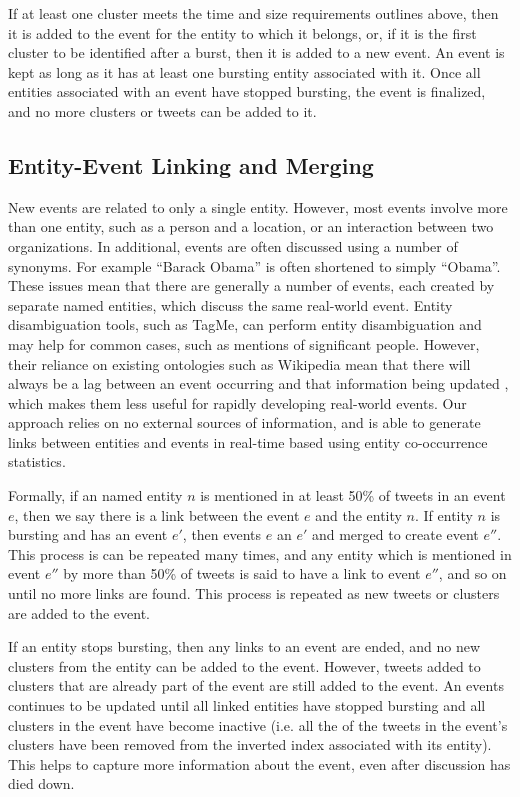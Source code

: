 If at least one cluster meets the time and size requirements outlines above, then it is added to the event for the entity to which it belongs, or, if it is the first cluster to be identified after a burst, then it is added to a new event.
An event is kept as long as it has at least one bursting entity associated with it.
Once all entities associated with an event have stopped bursting, the event is finalized, and no more clusters or tweets can be added to it.

\subsection{Entity-Event Linking and Merging}
\label{detection:sec:entityLinking}
New events are related to only a single entity.
However, most events involve more than one entity, such as a person and a location, or an interaction between two organizations.
In additional, events are often discussed using a number of synonyms.
For example ``Barack Obama'' is often shortened to simply ``Obama''.
These issues mean that there are generally a number of events, each created by separate named entities, which discuss the same real-world event.
Entity disambiguation tools, such as TagMe, can perform entity disambiguation and may help for common cases, such as mentions of significant people.
However, their reliance on existing ontologies such as Wikipedia mean that there will always be a lag between an event occurring and that information being updated \citep{WRN2012:osbornebieber}, which makes them less useful for rapidly developing real-world events.
Our approach relies on no external sources of information, and is able to generate links between entities and events in real-time based using entity co-occurrence statistics.

Formally, if an named entity $n$ is mentioned in at least 50\% of tweets in an event $e$, then we say there is a link between the event $e$ and the entity $n$.
If entity $n$ is bursting and has an event $e'$, then events $e$ an $e'$ and merged to create event $e''$.
This process is can be repeated many times, and any entity which is mentioned in event $e''$ by more than 50\% of tweets is said to have a link to event $e''$, and so on until no more links are found.
This process is repeated as new tweets or clusters are added to the event.

If an entity stops bursting, then any links to an event are ended, and no new clusters from the entity can be added to the event.
However, tweets added to clusters that are already part of the event are still added to the event.
An events continues to be updated until all linked entities have stopped bursting and all clusters in the event have become inactive (i.e. all the of the tweets in the event's clusters have been removed from the inverted index associated with its entity).
This helps to capture more information about the event, even after discussion has died down.

